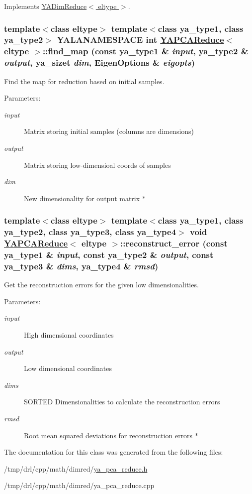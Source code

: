 Implements \hyperlink{class_y_a_dim_reduce_a8}{YADim\-Reduce$<$ eltype $>$}.\hypertarget{class_y_a_p_c_a_reduce_a5}{
\subsubsection[find\_\-map]{\setlength{\rightskip}{0pt plus 5cm}template$<$class eltype$>$ template$<$class ya\_\-type1, class ya\_\-type2$>$ YALANAMESPACE int \hyperlink{class_y_a_p_c_a_reduce}{YAPCAReduce}$<$ eltype $>$::find\_\-map (const ya\_\-type1 \& {\em input}, ya\_\-type2 \& {\em output}, ya\_\-sizet {\em dim}, Eigen\-Options \& {\em eigopts})}}
\label{class_y_a_p_c_a_reduce_a5}


Find the map for reduction based on initial samples. 

\begin{Desc}
\item[Parameters:]
\begin{description}
\item[{\em input}]Matrix storing initial samples (columns are dimensions) \item[{\em output}]Matrix storing low-dimensioal coords of samples \item[{\em dim}]New dimensionality for output matrix $\ast$ \end{description}
\end{Desc}
\hypertarget{class_y_a_p_c_a_reduce_a11}{
\subsubsection[reconstruct\_\-error]{\setlength{\rightskip}{0pt plus 5cm}template$<$class eltype$>$ template$<$class ya\_\-type1, class ya\_\-type2, class ya\_\-type3, class ya\_\-type4$>$ void \hyperlink{class_y_a_p_c_a_reduce}{YAPCAReduce}$<$ eltype $>$::reconstruct\_\-error (const ya\_\-type1 \& {\em input}, const ya\_\-type2 \& {\em output}, const ya\_\-type3 \& {\em dims}, ya\_\-type4 \& {\em rmsd})}}
\label{class_y_a_p_c_a_reduce_a11}


Get the reconstruction errors for the given low dimensionalities. 

\begin{Desc}
\item[Parameters:]
\begin{description}
\item[{\em input}]High dimensional coordinates \item[{\em output}]Low dimensional coordinates \item[{\em dims}]SORTED Dimensionalities to calculate the reconstruction errors \item[{\em rmsd}]Root mean squared deviations for reconstruction errors $\ast$ \end{description}
\end{Desc}


The documentation for this class was generated from the following files:\begin{CompactItemize}
\item 
/tmp/drl/cpp/math/dimred/\hyperlink{ya__pca__reduce_8h}{ya\_\-pca\_\-reduce.h}\item 
/tmp/drl/cpp/math/dimred/ya\_\-pca\_\-reduce.cpp\end{CompactItemize}
